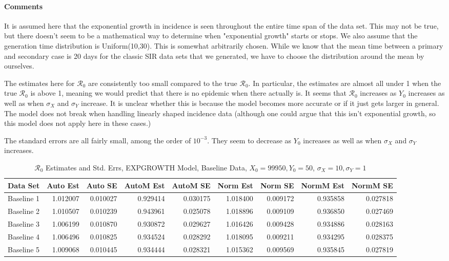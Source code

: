 \documentclass[12pt]{article}
\newcommand{\rr}{\ensuremath{\mathcal{R}_0}}
\begin{document}
\paragraph{Comments}

It is assumed here that the exponential growth in incidence is seen throughout the entire time span of the data set. This may not be true, but there doesn't seem to be a mathematical way to determine when "exponential growth" starts or stops. We also assume that the generation time distribution is Uniform(10,30). This is somewhat arbitrarily chosen. While we know that the mean time between a primary and secondary case is 20 days for the classic SIR data sets that we generated, we have to choose the distribution around the mean by ourselves.

The estimates here for $\rr$ are consistently too small compared to the true $\rr$. In particular, the estimates are almost all under 1 when the true $\rr$ is above 1, meaning we would predict that there is no epidemic when there actually is. It seems that $\rr$ increases as $Y_0$ increases as well as when $\sigma_X$ and $\sigma_Y$ increase. It is unclear whether this is because the model becomes more accurate or if it just gets larger in general. The model does not break when handling linearly shaped incidence data (although one could argue that this isn't exponential growth, so this model does not apply here in these cases.)

The standard errors are all fairly small, among the order of $10^{-3}$. They seem to decrease as $Y_0$ increases as well as when $\sigma_X$ and $\sigma_Y$ increases.

\begin{table}[H]
	
	\caption{$\rr$ Estimates and Std. Errs, EXPGROWTH Model, 
		Baseline Data, $X_0 = 99950, Y_0 = 50$, 
		$\sigma_X = 10, \sigma_Y = 1$}
	\begin{footnotesize}
		\hskip -1cm
		\begin{tabular}{l|r|r|r|r|r|r|r|r}
			\hline
			Data Set & Auto Est & Auto SE & AutoM Est & AutoM SE & Norm Est & Norm SE & NormM Est & NormM SE\\
			\hline
			Baseline 1 & 1.012007 & 0.010027 & 0.929414 & 0.030175 & 1.018400 & 0.009172 & 0.935858 & 0.027818\\
			\hline
			Baseline 2 & 1.010507 & 0.010239 & 0.943961 & 0.025078 & 1.018896 & 0.009109 & 0.936850 & 0.027469\\
			\hline
			Baseline 3 & 1.006199 & 0.010870 & 0.930872 & 0.029627 & 1.016426 & 0.009428 & 0.934886 & 0.028163\\
			\hline
			Baseline 4 & 1.006496 & 0.010825 & 0.934524 & 0.028292 & 1.018095 & 0.009211 & 0.934295 & 0.028375\\
			\hline
			Baseline 5 & 1.009068 & 0.010445 & 0.934444 & 0.028321 & 1.015362 & 0.009569 & 0.935845 & 0.027819\\
			\hline
		\end{tabular}
	\end{footnotesize}
\end{table}
\end{document}
